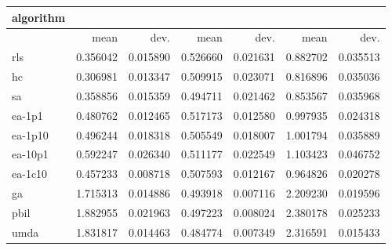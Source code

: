 \begin{tabular}{@{}l*{6}{>{{}}N{1}{2}}@{}}
\toprule
{algorithm} &  &  &  \\
\midrule
& {mean} & {dev.} & {mean} & {dev.} & {mean} & {dev.} \\
\midrule
rls & 0.356042 & 0.015890 & 0.526660 & 0.021631 & 0.882702 & 0.035513 \\
 hc & 0.306981 & 0.013347 & 0.509915 & 0.023071 & 0.816896 & 0.035036 \\
 sa & 0.358856 & 0.015359 & 0.494711 & 0.021462 & 0.853567 & 0.035968 \\
 ea-1p1 & 0.480762 & 0.012465 & 0.517173 & 0.012580 & 0.997935 & 0.024318 \\
 ea-1p10 & 0.496244 & 0.018318 & 0.505549 & 0.018007 & 1.001794 & 0.035889 \\
 ea-10p1 & 0.592247 & 0.026340 & 0.511177 & 0.022549 & 1.103423 & 0.046752 \\
 ea-1c10 & 0.457233 & 0.008718 & 0.507593 & 0.012167 & 0.964826 & 0.020278 \\
 ga & 1.715313 & 0.014886 & 0.493918 & 0.007116 & 2.209230 & 0.019596 \\
 pbil & 1.882955 & 0.021963 & 0.497223 & 0.008024 & 2.380178 & 0.025233 \\
 umda & 1.831817 & 0.014463 & 0.484774 & 0.007349 & 2.316591 & 0.015433 \\
 \bottomrule
\end{tabular}
